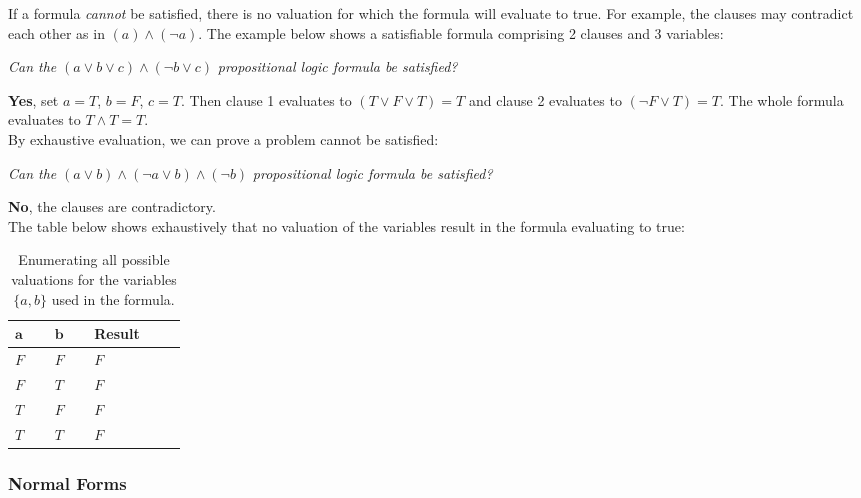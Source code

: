 \documentclass[a4paper,openany,12pt]{book}
\begin{document}
If a formula \emph{cannot} be satisfied, there is no valuation for which the formula will evaluate to true.
For example, the clauses may contradict each other as in $(a) \land (\neg a)$.
The example below shows a satisfiable formula comprising 2 clauses and 3 variables:

\emph{Can the} \(
    (a \lor b \lor c) \land (\neg b \lor c)
\) \emph{propositional logic formula be satisfied?}

\textcolor{id7-emerald-green}{\textbf{Yes}}, set $a = T$, $b=F$, $c=T$.
Then clause 1 evaluates to $(T \lor F \lor T) = T$ and clause 2 evaluates to $(\neg F \lor T) = T$.
The whole formula evaluates to $T \land T = T$.\\

By exhaustive evaluation, we can prove a problem cannot be satisfied:

\emph{Can the} \(
    (a \lor b) \land (\neg a \lor b) \land (\neg b)
\) \emph{propositional logic formula be satisfied?}

\textcolor{id7-ruby-red}{\textbf{No}}, the clauses are contradictory.\\
The table below shows exhaustively that no valuation of the variables result in the formula evaluating to true:

\def\arraystretch{1.5}%
\begin{table}[H]
    \centering
    \begin{tabular}[t]{|p{0.05\linewidth}|p{0.05\linewidth}|p{0.1\linewidth}|}
        \hline
        \rowcolor{id7-aubergine}
        {\color[HTML]{FFFFFF} $\mathbf{a}$} & {\color[HTML]{FFFFFF} $\mathbf{b}$} & {\color[HTML]{FFFFFF} \sffamily  \textbf{Result}} \\ \hline
        $F$ & $F$ & $F$  \\ \hline
        $F$ & $T$ & $F$  \\ \hline
        $T$ & $F$ & $F$  \\ \hline
        $T$ & $T$ & $F$  \\ \hline
    \end{tabular}
    \caption{Enumerating all possible valuations for the variables $\{a, b\}$ used in the formula.}
    \label{table:landingredesign}
\end{table}

\subsubsection{Normal Forms}
\end{document}

